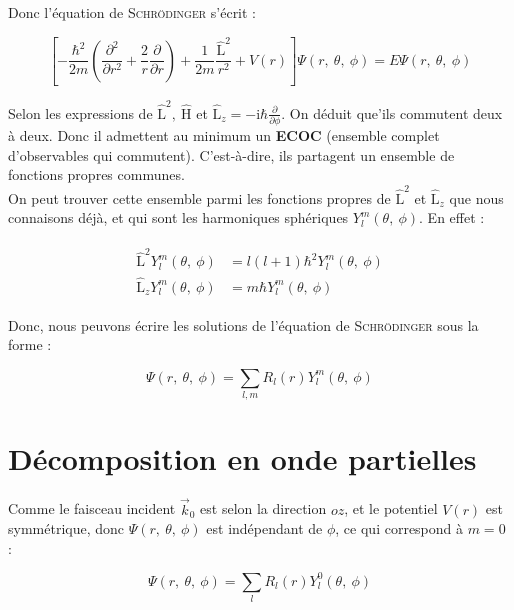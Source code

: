 \documentclass[12pt,a4paper,oneside,french]{book}
\renewcommand{\i}{\mathrm{i}}
\newcommand{\opr}[1]{\mathrm{\hat{#1}}}
\theoremstyle{definition}
\theoremstyle{definition}
\theoremstyle{definition}
\theoremstyle{remark}
\theoremstyle{definition}
\begin{document}
    Donc l'équation de \textsc{Schrödinger} s'écrit :
    
    \begin{equation*}
        \left[-\frac{{\hbar}^{2}}{2 m} \left(\frac{{\partial}^{2}}{\partial {r}^{2}} + \frac{2}{r} \frac{\partial}{\partial r}\right) + \frac{1}{2 m} \frac{{\opr{L}}^{2}}{{r}^{2}} + V(r)\right] \Psi(r, \ \theta, \ \phi) = E \Psi(r, \ \theta, \ \phi)
    \end{equation*}
    
    Selon les expressions de ${\opr{L}}^{2}, \ \opr{H}$ et ${\opr{L}}_{z} = - \i \hbar \frac{\partial}{\partial \phi}$. On déduit que'ils commutent deux à deux. Donc il admettent au minimum un \textbf{ECOC} (ensemble complet d'observables qui commutent). C'est-à-dire, ils partagent un ensemble de fonctions propres communes. \\
    
    On peut trouver cette ensemble parmi les fonctions propres de ${\opr{L}}^{2}$ et ${\opr{L}}_{z}$ que nous connaisons déjà, et qui sont les harmoniques sphériques ${Y}_{l}^{m}(\theta, \ \phi)$. En effet :
    
    \begin{align} \label{ch2eq/2}
    \begin{split}
        {\opr{L}}^{2} {Y}_{l}^{m}(\theta, \ \phi) &= l(l + 1) {\hbar}^{2} {Y}_{l}^{m}(\theta, \ \phi) \\
        {\opr{L}}_{z} {Y}_{l}^{m}(\theta, \ \phi) &= m \hbar {Y}_{l}^{m}(\theta, \ \phi)
    \end{split}
    \end{align}
    
    Donc, nous peuvons écrire les solutions de l'équation de \textsc{Schrödinger} sous la forme :
    
    \begin{equation*}
        \Psi(r, \ \theta, \ \phi) = \sum_{l, m} {R}_{l}(r) {Y}_{l}^{m}(\theta, \ \phi)
    \end{equation*}
    
    \section{Décomposition en onde partielles}
    Comme le faisceau incident ${\vec{k}}_{0}$ est selon la direction $oz$, et le potentiel $V(r)$ est symmétrique, donc $\Psi(r, \ \theta, \ \phi)$ est indépendant de $\phi$, ce qui correspond à $m = 0$ :
    
    \begin{equation*}
        \Psi(r, \ \theta, \ \phi) = \sum_{l} {R}_{l}(r) {Y}_{l}^{0}(\theta, \ \phi)
    \end{equation*}
    
\end{document}
